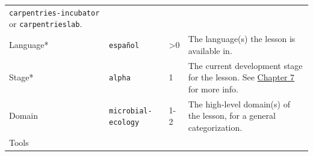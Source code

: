 \documentclass[
]{book}
\begin{document}
\begin{longtable}[]{@{}llll@{}}
\begin{minipage}[t]{0.29\columnwidth}
\texttt{carpentries-incubator} or \texttt{carpentrieslab}.\strut
\end{minipage}\tabularnewline
\begin{minipage}[t]{0.22\columnwidth}\raggedright
Language*\strut
\end{minipage} & \begin{minipage}[t]{0.20\columnwidth}\raggedright
\texttt{español}\strut
\end{minipage} & \begin{minipage}[t]{0.18\columnwidth}\raggedright
\textgreater0\strut
\end{minipage} & \begin{minipage}[t]{0.29\columnwidth}\raggedright
The language(s) the lesson is available in.\strut
\end{minipage}\tabularnewline
\begin{minipage}[t]{0.22\columnwidth}\raggedright
Stage*\strut
\end{minipage} & \begin{minipage}[t]{0.20\columnwidth}\raggedright
\texttt{alpha}\strut
\end{minipage} & \begin{minipage}[t]{0.18\columnwidth}\raggedright
1\strut
\end{minipage} & \begin{minipage}[t]{0.29\columnwidth}\raggedright
The current development stage for the lesson. See \href{https://cdh.carpentries.org/the-lesson-life-cycle.html\#overview-and-definitions}{Chapter 7} for more info.\strut
\end{minipage}\tabularnewline
\begin{minipage}[t]{0.22\columnwidth}\raggedright
Domain\strut
\end{minipage} & \begin{minipage}[t]{0.20\columnwidth}\raggedright
\texttt{microbial-ecology}\strut
\end{minipage} & \begin{minipage}[t]{0.18\columnwidth}\raggedright
1-2\strut
\end{minipage} & \begin{minipage}[t]{0.29\columnwidth}\raggedright
The high-level domain(s) of the lesson, for a general categorization.\strut
\end{minipage}\tabularnewline
\begin{minipage}[t]{0.22\columnwidth}\raggedright
Tools\strut
\end{minipage} & \begin{minipage}[t]{0.20\columnwidth}\raggedright

\end{minipage}
\end{longtable}
\end{document}
